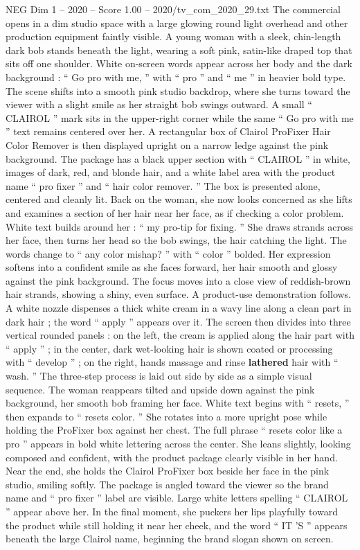 \begin{textsample}{NEG Dim 1 – 2020 – Score 1.00 – 2020/tv\_com\_2020\_29.txt}  \label{ex:f1_neg_081}
The commercial opens in a dim studio space with a large glowing round light overhead and other production equipment faintly visible.
A young woman with a sleek, chin-length dark bob stands beneath the light, wearing a soft pink, satin-like draped top that sits off one shoulder.
White on-screen words appear across her body and the dark background : “ Go pro with me, ” with “ pro ” and “ me ” in heavier bold type.
The scene shifts into a smooth pink studio backdrop, where she turns toward the viewer with a slight smile as her straight bob swings outward.
A small “ CLAIROL ” mark sits in the upper-right corner while the same “ Go pro with me ” text remains centered over her.
A rectangular box of Clairol ProFixer Hair Color Remover is then displayed upright on a narrow ledge against the pink background.
The package has a black upper section with “ CLAIROL ” in white, images of dark, red, and blonde hair, and a white label area with the product name “ pro fixer ” and “ hair color remover. ” The box is presented alone, centered and cleanly lit.
Back on the woman, she now looks concerned as she lifts and examines a section of her hair near her face, as if checking a color problem.
White text builds around her : “ my pro-tip for fixing. ” She draws strands across her face, then turns her head so the bob swings, the hair catching the light.
The words change to “ any color mishap? ” with “ color ” bolded.
Her expression softens into a confident smile as she faces forward, her hair smooth and glossy against the pink background.
The focus moves into a close view of reddish-brown hair strands, showing a shiny, even surface.
A product-use demonstration follows.
A white nozzle dispenses a thick white cream in a wavy line along a clean part in dark hair ; the word “ apply ” appears over it.
The screen then divides into three vertical rounded panels : on the left, the cream is applied along the hair part with “ apply ” ; in the center, dark wet-looking hair is shown coated or processing with “ develop ” ; on the right, hands massage and rinse \textbf{lathered} hair with “ wash. ” The three-step process is laid out side by side as a simple visual sequence.
The woman reappears tilted and upside down against the pink background, her smooth bob framing her face.
White text begins with “ resets, ” then expands to “ resets color. ” She rotates into a more upright pose while holding the ProFixer box against her chest.
The full phrase “ resets color like a pro ” appears in bold white lettering across the center.
She leans slightly, looking composed and confident, with the product package clearly visible in her hand.
Near the end, she holds the Clairol ProFixer box beside her face in the pink studio, smiling softly.
The package is angled toward the viewer so the brand name and “ pro fixer ” label are visible.
Large white letters spelling “ CLAIROL ” appear above her.
In the final moment, she puckers her lips playfully toward the product while still holding it near her cheek, and the word “ IT ’S ” appears beneath the large Clairol name, beginning the brand slogan shown on screen.

\end{textsample}
